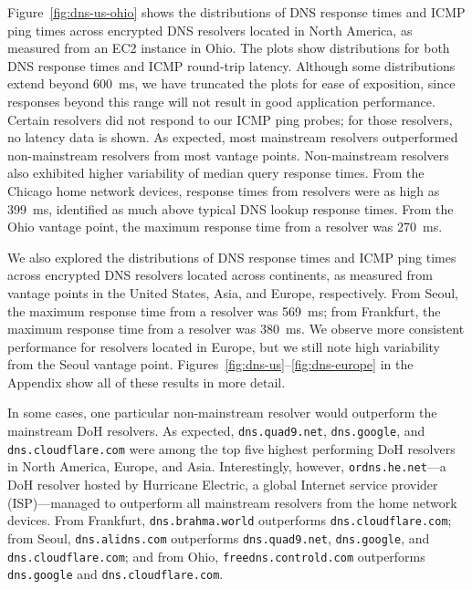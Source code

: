 Figure~\ref{fig:dns-us-ohio} shows the distributions of DNS response times and
ICMP ping times across encrypted DNS resolvers located in North America, as
measured from an EC2 instance in Ohio.  The plots show distributions for both
DNS response times and ICMP round-trip latency.  Although some distributions
extend beyond 600~ms, we have truncated the plots for ease of exposition,
since responses beyond this range will not result in good application
performance.  Certain resolvers did not respond to our ICMP ping probes; for
those resolvers, no latency data is shown.
As expected, most mainstream resolvers outperformed non-mainstream resolvers
from most vantage points.  Non-mainstream resolvers also exhibited higher
variability of median query response times.  
From the Chicago home network devices, response times from resolvers were as
high as 399~ms, identified as much above typical DNS lookup response times.
From the Ohio vantage point, the maximum response time from a resolver was 270~ms. 

We also explored the distributions of DNS response times and ICMP ping times
across encrypted DNS resolvers located across continents, as measured from
vantage points in the United States, Asia, and Europe, respectively.  From
Seoul, the maximum response time from a resolver was 569~ms; from Frankfurt,
the maximum response time from a resolver was 380~ms.  We observe more
consistent performance for resolvers located in Europe, but we still note high
variability from the Seoul vantage point.
Figures~\ref{fig:dns-us}--\ref{fig:dns-europe} in the Appendix show all of
these results in more detail.

In some cases, one particular non-mainstream resolver would outperform
the mainstream DoH resolvers.  As expected, \texttt{dns.quad9.net},
\texttt{dns.google}, and \texttt{dns.cloudflare.com} were among the top five
highest performing DoH resolvers in North America, Europe, and Asia.
Interestingly, however, \texttt{ordns.he.net}---a DoH resolver hosted by
Hurricane Electric, a global Internet service provider (ISP)---managed to
outperform all mainstream resolvers from the home network devices. From Frankfurt, \texttt{dns.brahma.world}
outperforms \texttt{dns.cloudflare.com}; from Seoul, \texttt{dns.alidns.com} outperforms \texttt{dns.quad9.net},
\texttt{dns.google}, and \texttt{dns.cloudflare.com}; and from Ohio, \texttt{freedns.controld.com} outperforms \texttt{dns.google}
and \texttt{dns.cloudflare.com}.

